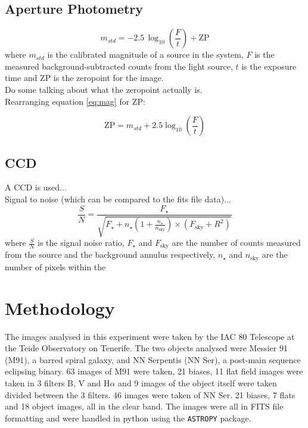 \documentclass[%
reprint,
amsmath,amssymb,
aps,
]{revtex4-2}
\begin{document}
		\subsection{Aperture Photometry}
		
			\begin{equation}
				m_{std} = -2.5 \, \log_{10}\left(\frac{F}{t}\right) + \text{ZP}
				\label{eq:mag}
			\end{equation} where $m_{std}$ is the calibrated magnitude of a source in the system, $F$ is the measured background-subtracted counts from the light source, $t$ is the exposure time and $\text{ZP}$ is the zeropoint for the image.\\
		
			Do some talking about what the zeropoint actually is.\\
			
			Rearranging equation \ref{eq:mag} for $\text{ZP}$:
			
			\begin{equation}
				\text{ZP} = m_{std} + 2.5 \log_{10}\left(\frac{F}{t}\right)
				\label{eq:zeropoint}
			\end{equation}
		
		\subsection{CCD}
		
			A CCD is used...\\
			
			Signal to noise (which can be compared to the fits file data)...\\
			
			\begin{equation}
				\frac{S}{N} = \frac{F_\star}{\sqrt{F_\star + n_\star \left( 1 + \frac{n_\star}{n_\text{sky}}\right) \times \left(F_\text{sky} + R^2\right)}}
			\end{equation}where $\frac{S}{N}$ is the signal noise ratio, $F_\star$ and $F_\text{sky}$ are the number of counts measured from the source and the background annulus respectively, $n_\star$ and $n_\text{sky}$ are the number of pixels within the  
	 
	\section{Methodology}
	
		The images analysed in this experiment were taken by the IAC 80 Telescope at the Teide Observatory on Tenerife. The two objects analysed were Messier 91 (M91), a barred spiral galaxy\cite{messier}, and NN Serpentis (NN Ser), a post-main sequence eclipsing binary\cite{Horner_2012}. 63 images of M91 were taken, 21 biases, 11 flat field images were taken in 3 filters B, V and H$\alpha$ and 9 images of the object itself were taken divided between the 3 filters. 46 images were taken of NN Ser. 21 biases, 7 flats and 18 object images, all in the clear band. The images were all in FITS file formatting and were handled in python using the \texttt{ASTROPY} package.
	
\end{document}

